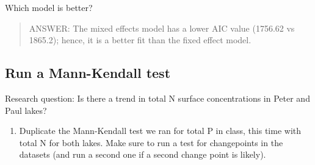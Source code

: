 \documentclass[]{article}
\newenvironment{Shaded}{\begin{snugshade}}{\end{snugshade}}
\newcommand{\KeywordTok}[1]{\textcolor[rgb]{0.13,0.29,0.53}{\textbf{#1}}}
\newcommand{\DataTypeTok}[1]{\textcolor[rgb]{0.13,0.29,0.53}{#1}}
\newcommand{\DecValTok}[1]{\textcolor[rgb]{0.00,0.00,0.81}{#1}}
\newcommand{\StringTok}[1]{\textcolor[rgb]{0.31,0.60,0.02}{#1}}
\newcommand{\CommentTok}[1]{\textcolor[rgb]{0.56,0.35,0.01}{\textit{#1}}}
\newcommand{\OperatorTok}[1]{\textcolor[rgb]{0.81,0.36,0.00}{\textbf{#1}}}
\newcommand{\NormalTok}[1]{#1}
\providecommand{\tightlist}{%
  \setlength{\itemsep}{0pt}\setlength{\parskip}{0pt}}
\begin{document}
Which model is better?

\begin{quote}
ANSWER: The mixed effects model has a lower AIC value (1756.62 vs
1865.2); hence, it is a better fit than the fixed effect model.
\end{quote}

\subsection{Run a Mann-Kendall test}\label{run-a-mann-kendall-test}

Research question: Is there a trend in total N surface concentrations in
Peter and Paul lakes?

\begin{enumerate}
\def\labelenumi{\arabic{enumi}.}
\setcounter{enumi}{3}
\tightlist
\item
  Duplicate the Mann-Kendall test we ran for total P in class, this time
  with total N for both lakes. Make sure to run a test for changepoints
  in the datasets (and run a second one if a second change point is
  likely).
\end{enumerate}

\begin{Shaded}
\end{Shaded}
\end{document}
